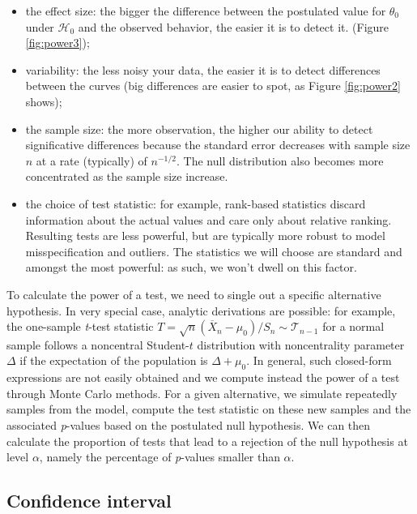\documentclass[
  11pt,
  letterpaper,
]{book}
\providecommand{\tightlist}{%
  \setlength{\itemsep}{0pt}\setlength{\parskip}{0pt}}
\theoremstyle{definition}
\theoremstyle{definition}
\theoremstyle{definition}
\theoremstyle{definition}
\theoremstyle{remark}
\begin{document}
\begin{itemize}
\tightlist
\item
  the effect size: the bigger the difference between the postulated value for \(\theta_0\) under \(\mathscr{H}_0\) and the observed behavior, the easier it is to detect it.
  (Figure \ref{fig:power3});
\item
  variability: the less noisy your data, the easier it is to detect differences between the curves (big differences are easier to spot, as Figure \ref{fig:power2} shows);
\item
  the sample size: the more observation, the higher our ability to detect significative differences because the standard error decreases with sample size \(n\) at a rate (typically) of \(n^{-1/2}\). The null distribution also becomes more concentrated as the sample size increase.
\item
  the choice of test statistic: for example, rank-based statistics discard information about the actual values and care only about relative ranking. Resulting tests are less powerful, but are typically more robust to model misspecification and outliers. The statistics we will choose are standard and amongst the most powerful: as such, we won't dwell on this factor.
\end{itemize}

To calculate the power of a test, we need to single out a specific alternative hypothesis. In very special case, analytic derivations are possible: for example, the one-sample \emph{t}-test statistic \(T=\sqrt{n}(\overline{X}_n-\mu_0)/S_n \sim \mathcal{T}_{n-1}\) for a normal sample follows a noncentral Student-\(t\) distribution with noncentrality parameter \(\Delta\) if the expectation of the population is \(\Delta + \mu_0\). In general, such closed-form expressions are not easily obtained and we compute instead the power of a test through Monte Carlo methods. For a given alternative, we simulate repeatedly samples from the model, compute the test statistic on these new samples and the associated \emph{p}-values based on the postulated null hypothesis. We can then calculate the proportion of tests that lead to a rejection of the null hypothesis at level \(\alpha\), namely the percentage of \emph{p}-values smaller than \(\alpha\).

\hypertarget{confidence-interval}{%
\subsection{Confidence interval}\label{confidence-interval}}
\end{document}
